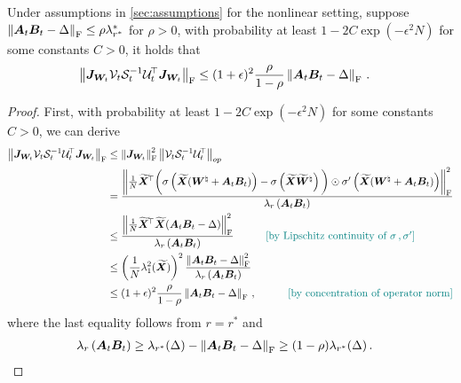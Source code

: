 \begin{lemma}
\label{err-cross}
   Under assumptions in \cref{sec:assumptions} for the nonlinear setting, suppose $\left\|\bm A_t\bm B_t - \Delta\right\|_{\rm F}\leq \rho \lambda^*_{r^*}$ for $\rho>0$, with probability at least $1-2C\operatorname{exp}\left(-\epsilon^2N\right)$ for some constants $C>0$, it holds that
    \begin{align*}
        \left\|\bm J_{\bm W_t} \mathcal{V}_t \mathcal{S}_t^{-1} \mathcal{U}^{\!\top}_t\bm J_{\bm W_t}\right\|_{\rm F}&\leq (1+\epsilon)^2 \frac{\rho}{1-\rho}\left\|\bm A_t\bm B_t-\Delta\right\|_{\rm F}\,.
    \end{align*}
\end{lemma}
\begin{proof}
    First, with probability at least $1-2C\operatorname{exp}\left(-\epsilon^2N\right)$ for some constants $C>0$, we can derive
    \begin{align*}
        \left\|\bm J_{\bm W_t} \mathcal{V}_t \mathcal{S}_t^{-1} \mathcal{U}^{\!\top}_t\bm J_{\bm W_t}\right\|_{\rm F} & \leq \left\|\bm J_{\bm W_t}\right\|^2_{\rm F}\left\|\mathcal{V}_t \mathcal{S}_t^{-1} \mathcal{U}^{\!\top}_t\right\|_{op}\\
        &=\frac{\left\|\frac{1}{N}\widetilde{\bm X}^{\!\top}\bigg(\sigma\left(\widetilde{\bm X}(\bm W^\natural+\bm A_t\bm B_t)\right) - \sigma\left(\widetilde{\bm X}\widetilde{\bm W}^\natural\right)\bigg) \odot \sigma'\left(\widetilde{\bm X}(\bm W^\natural+\bm A_t\bm B_t)\right)\right\|^2_{\rm F}}{\lambda_{r}\left(\bm A_t \bm B_t\right)}\\
        &\leq \frac{\left\|\frac{1}{N}\widetilde{\bm X}^{\!\top}\widetilde{\bm X}(\bm A_t\bm B_t-\Delta)\right\|^2_{\rm F}}{\lambda_{r}\left(\bm A_t \bm B_t\right)}\quad \tag*{\color{teal}[by Lipschitz continuity of $\sigma\,,\sigma'$]}\\
        &\leq \left(\frac{1}{N}\lambda^2_1(\widetilde{\bm X})\right)^2 \frac{\left\|\bm A_t\bm B_t-\Delta\right\|^2_{\rm F}}{\lambda_{r}\left(\bm A_t \bm B_t\right)}\\
        &\leq (1+\epsilon)^2 \frac{\rho}{1-\rho}\left\|\bm A_t\bm B_t-\Delta\right\|_{\rm F}\,, \quad \tag*{\color{teal}[by concentration of operator norm]}
    \end{align*}
    where the last equality follows from $r=r^*$ and
    \begin{align*}
        \lambda_{r}\left(\bm A_t \bm B_t\right) & \geq \lambda_{r^*}(\Delta) - \left\|\bm A_t\bm B_t-\Delta\right\|_{\rm F} \geq (1-\rho) \lambda_{r^*}(\Delta)\,.
    \end{align*}
\end{proof}
